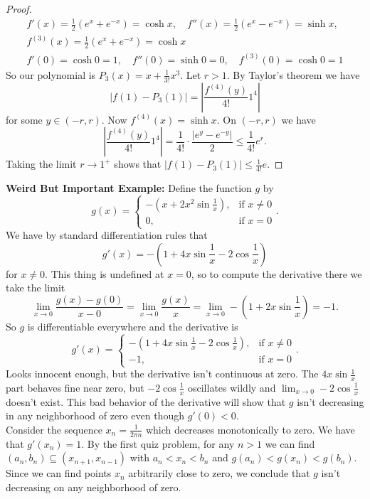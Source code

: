 \documentclass[12pt]{article}
\begin{document}
\begin{enumerate}
\begin{proof}
\begin{gather*}
		f'(x) = \frac{1}{2}(e^x + e^{-x}) = \cosh x,\quad f''(x) = \frac{1}{2}(e^x-e^{-x}) = \sinh x,\\f^{(3)}(x)= \frac{1}{2}(e^x + e^{-x}) = \cosh x\\
		f'(0) = \cosh 0 = 1,\quad f''(0) = \sinh 0 = 0,\quad f^{(3)}(0) = \cosh 0 = 1
		\end{gather*}
		So our polynomial is $P_3(x) = x + \frac{1}{3!}x^3$. Let $r>1$. By Taylor's theorem we have
		\[
		|f(1) - P_3(1)| = \left|\frac{f^{(4)}(y)}{4!}1^4\right|
		\]
		for some $y\in (-r, r)$. Now $f^{(4)}(x) = \sinh x$. On $(-r, r)$ we have
		\[
		\left|\frac{f^{(4)}(y)}{4!}1^4\right| = \frac{1}{4!}\cdot \frac{|e^y-e^{-y}|}{2} \leq \frac{1}{4!}e^r.
		\]
		Taking the limit $r\to 1^+$ shows that $|f(1)-P_3(1)| \leq \frac{1}{4!}e$.
	\end{proof}
	\vfill\null\pagebreak
\end{enumerate}

\noindent\textbf{Weird But Important Example: }Define the function $g$ by
\[
g(x) = \begin{cases}
	-(x + 2x^2\sin \frac{1}{x}),&\text{if }x\neq 0\\
	0,&\text{if }x = 0
\end{cases}.
\]
We have by standard differentiation rules that
\[
g'(x) = -(1 + 4x\sin\frac{1}{x} - 2\cos\frac{1}{x})
\]
for $x \neq 0$. This thing is undefined at $x=0$, so to compute the derivative there we take the limit
\[
\lim_{x\to 0}\frac{g(x)-g(0)}{x-0} = \lim_{x\to 0}\frac{g(x)}{x} = \lim_{x\to 0}-(1+2x\sin\frac{1}{x}) = -1.
\]
So $g$ is differentiable everywhere and the derivative is
\[
g'(x) = \begin{cases}
	-(1+4x\sin\frac{1}{x}-2\cos\frac{1}{x}),&\text{if }x\neq 0\\
	-1,&\text{if }x=0
\end{cases}.
\]
Looks innocent enough, but the derivative isn't continuous at zero. The $4x\sin\frac{1}{x}$ part behaves fine near zero, but $-2\cos\frac{1}{x}$ oscillates wildly and $\lim_{x\to 0}-2\cos \frac{1}{x}$ doesn't exist. This bad behavior of the derivative will show that $g$ isn't decreasing in any neighborhood of zero even though $g'(0)<0$.\\

\noindent Consider the sequence $x_n = \frac{1}{2\pi n}$ which decreases monotonically to zero. We have that $g'(x_n) = 1$. By the first quiz problem, for any $n>1$ we can find $(a_n, b_n)\subseteq (x_{n+1}, x_{n-1})$ with $a_n<x_n<b_n$ and $g(a_n)<g(x_n)<g(b_n)$. Since we can find points $x_n$ arbitrarily close to zero, we conclude that $g$ isn't decreasing on any neighborhood of zero.

\end{document}
